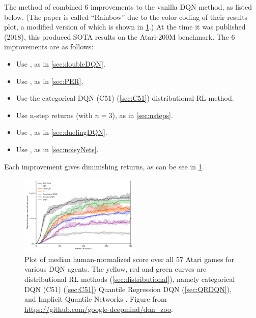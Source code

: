 The  method of \citep{rainbow}
combined 6 improvements to the vanilla DQN method,
as listed below.
(The paper is called ``Rainbow'' due to the color coding
of their results plot, a modified version of which is shown in
\cref{fig:rainbow}.)
At the time it was published (2018), this produced 
SOTA results on the Atari-200M benchmark.
The 6 improvements are as follows:
\begin{itemize}
\item Use , as in \cref{sec:doubleDQN}.

    \item  Use 
  ,  as in \cref{sec:PER}.

  
\item  Use the
categorical DQN (C51) (\cref{sec:C51}) 
distributional RL method.

  \item Use n-step returns (with $n=3$), as in \cref{sec:nsteps}.
  
\item Use , as in \cref{sec:duelingDQN}.

\item Use , as in \cref{sec:noisyNets}.
\end{itemize}
Each improvement gives diminishing returns,
as can be see in \cref{fig:rainbow}.

\begin{figure}
\centering
\includegraphics[height=1.5in]{figs/rainbow}
\caption{
  Plot of median human-normalized score over all 57 Atari games for
  various DQN agents.
  The yellow, red and green curves are distributional RL methods
  (\cref{sec:distributional}),
  namely categorical DQN (C51) (\cref{sec:C51})
  Quantile Regression DQN (\cref{sec:QRDQN}),
  and Implicit Quantile Networks \citep{IQN}.
  Figure from \url{https://github.com/google-deepmind/dqn_zoo}.
}
\label{fig:rainbow}
\end{figure}



